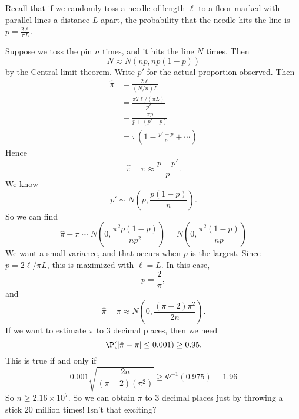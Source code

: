 \documentclass[a4paper]{article}
\begin{document}
\begin{eg}
  Recall that if we randomly toss a needle of length $\ell$ to a floor marked with parallel lines a distance $L$ apart, the probability that the needle hits the line is $p = \frac{2\ell}{\pi L}$.
  \begin{center}
  \end{center}
  Suppose we toss the pin $n$ times, and it hits the line $N$ times. Then
  \[
    N\approx N(np, np(1 - p))
  \]
  by the Central limit theorem. Write $p'$ for the actual proportion observed. Then
  \begin{align*}
    \hat{\pi} &= \frac{2\ell}{(N/n) L} \\
    &= \frac{\pi 2\ell/(\pi L)}{p'}\\
    &= \frac{\pi p}{p + (p' - p)}\\
    &= \pi \left(1 - \frac{p' - p}{p} + \cdots \right)
  \end{align*}
  Hence
  \[
    \hat\pi - \pi \approx \frac{p - p'}{p}.
  \]
  We know
  \[
    p' \sim N\left(p, \frac{p(1 - p)}{n}\right).
  \]
  So we can find
  \[
    \hat \pi - \pi \sim N\left(0, \frac{\pi^2 p(1 - p)}{np^2}\right) = N\left(0, \frac{\pi^2(1 - p)}{np}\right)
  \]
  We want a small variance, and that occurs when $p$ is the largest. Since $p = 2\ell/\pi L$, this is maximized with $\ell = L$. In this case,
  \[
    p = \frac{2}{\pi},
  \]
  and
  \[
    \hat \pi - \pi \approx N\left(0, \frac{(\pi - 2)\pi^2}{2n}\right).
  \]
  If we want to estimate $\pi$ to 3 decimal places, then we need
  \[
    \P(|\hat \pi - \pi| \leq 0.001) \geq 0.95.
  \]
  This is true if and only if
  \[
    0.001\sqrt{\frac{2n}{(\pi - 2)(\pi^2)}} \geq \Phi^{-1}(0.975) = 1.96
  \]
  So $n\geq 2.16 \times 10^7$. So we can obtain $\pi$ to 3 decimal places just by throwing a stick 20 million times! Isn't that exciting?
\end{eg}
\end{document}
